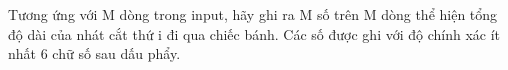 Tương ứng với M dòng trong input, hãy ghi ra M số trên M dòng thể hiện tổng độ dài của nhát cắt thứ i đi qua chiếc bánh. Các số được ghi với độ chính xác ít nhất 6 chữ số sau dấu phẩy.  

\
